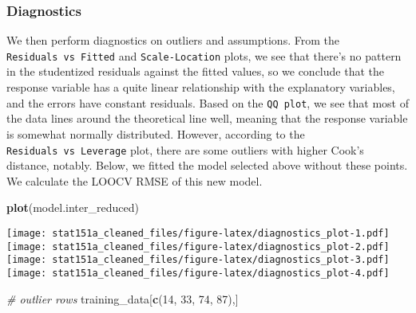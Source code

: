 \documentclass[
]{article}
\newenvironment{Shaded}{\begin{snugshade}}{\end{snugshade}}
\newcommand{\CommentTok}[1]{\textcolor[rgb]{0.56,0.35,0.01}{\textit{#1}}}
\newcommand{\DecValTok}[1]{\textcolor[rgb]{0.00,0.00,0.81}{#1}}
\newcommand{\KeywordTok}[1]{\textcolor[rgb]{0.13,0.29,0.53}{\textbf{#1}}}
\newcommand{\NormalTok}[1]{#1}
\begin{document}
\hypertarget{diagnostics}{%
\subsubsection{Diagnostics}\label{diagnostics}}

We then perform diagnostics on outliers and assumptions. From the
\texttt{Residuals\ vs\ Fitted} and \texttt{Scale-Location} plots, we see
that there's no pattern in the studentized residuals against the fitted
values, so we conclude that the response variable has a quite linear
relationship with the explanatory variables, and the errors have
constant residuals. Based on the \texttt{QQ\ plot}, we see that most of
the data lines around the theoretical line well, meaning that the
response variable is somewhat normally distributed. However, according
to the \texttt{Residuals\ vs\ Leverage} plot, there are some outliers
with higher Cook's distance, notably. Below, we fitted the model
selected above without these points. We calculate the LOOCV RMSE of this
new model.

\begin{Shaded}
\begin{Highlighting}[]
\KeywordTok{plot}\NormalTok{(model.inter_reduced)}
\end{Highlighting}
\end{Shaded}

\texttt{[image: stat151a\_cleaned\_files/figure-latex/diagnostics\_plot-1.pdf]}
\texttt{[image: stat151a\_cleaned\_files/figure-latex/diagnostics\_plot-2.pdf]}
\texttt{[image: stat151a\_cleaned\_files/figure-latex/diagnostics\_plot-3.pdf]}
\texttt{[image: stat151a\_cleaned\_files/figure-latex/diagnostics\_plot-4.pdf]}

\begin{Shaded}
\begin{Highlighting}[]
\CommentTok{# outlier rows }
\NormalTok{training_data[}\KeywordTok{c}\NormalTok{(}\DecValTok{14}\NormalTok{, }\DecValTok{33}\NormalTok{, }\DecValTok{74}\NormalTok{, }\DecValTok{87}\NormalTok{),]}
\end{Highlighting}
\end{Shaded}
\end{document}
